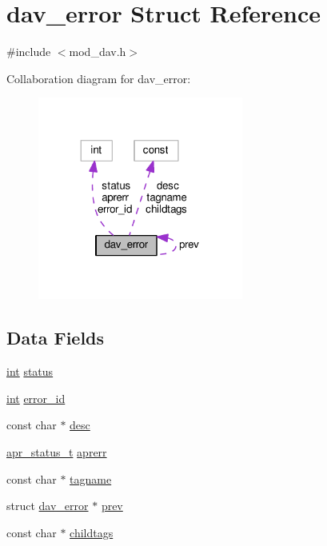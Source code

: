 \hypertarget{structdav__error}{}\section{dav\+\_\+error Struct Reference}
\label{structdav__error}


{\ttfamily \#include $<$mod\+\_\+dav.\+h$>$}



Collaboration diagram for dav\+\_\+error\+:
\nopagebreak
\begin{figure}[H]
\begin{center}
\leavevmode
\includegraphics[width=191pt]{structdav__error__coll__graph}
\end{center}
\end{figure}
\subsection*{Data Fields}
\begin{DoxyCompactItemize}
\item 
\hyperlink{pcre_8txt_a42dfa4ff673c82d8efe7144098fbc198}{int} \hyperlink{structdav__error_a128d24c8403fc5525e754f96700d4e41}{status}
\item 
\hyperlink{pcre_8txt_a42dfa4ff673c82d8efe7144098fbc198}{int} \hyperlink{structdav__error_ac9cebd6187180bee43f17827c4acdd48}{error\+\_\+id}
\item 
const char $\ast$ \hyperlink{structdav__error_a9894d4e9640835e59e1d20b18c908b5b}{desc}
\item 
\hyperlink{group__apr__errno_gaa5105fa83cc322f09382292db8b47593}{apr\+\_\+status\+\_\+t} \hyperlink{structdav__error_ad95d9a9ce9089ec9707954a62b114d96}{aprerr}
\item 
const char $\ast$ \hyperlink{structdav__error_ae599c7a34410523fcb9acf056e3c0c15}{tagname}
\item 
struct \hyperlink{structdav__error}{dav\+\_\+error} $\ast$ \hyperlink{structdav__error_a3f0073566e4ca92a9a42c0cde6ee01e9}{prev}
\item 
const char $\ast$ \hyperlink{structdav__error_a271000873c7ffb93ff416ea8492bf8f6}{childtags}
\end{DoxyCompactItemize}


